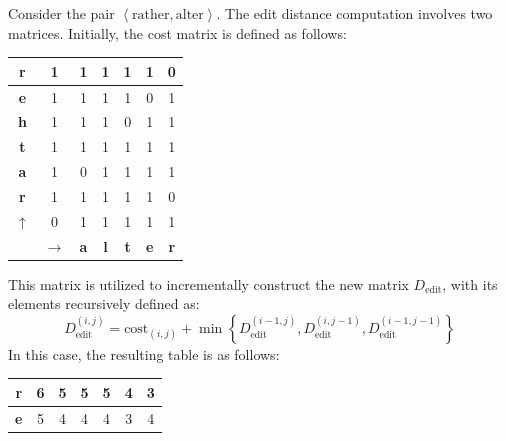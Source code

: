 \begin{example}
    Consider the pair $\left\langle \text{rather},\text{alter} \right\rangle$. 
    The edit distance computation involves two matrices. 
    Initially, the cost matrix is defined as follows:
    \begin{table}[H]
        \centering
        \begin{tabular}{c|c|c|c|c|c|c|}
        \hline
        \multicolumn{1}{|c|}{\textbf{r}} & 1         & 1          & 1          & 1          & 1          & 0          \\ \hline
        \multicolumn{1}{|c|}{\textbf{e}} & 1         & 1          & 1          & 1          & 0          & 1          \\ \hline
        \multicolumn{1}{|c|}{\textbf{h}} & 1         & 1          & 1          & 0          & 1          & 1          \\ \hline
        \multicolumn{1}{|c|}{\textbf{t}} & 1         & 1          & 1          & 1          & 1          & 1          \\ \hline
        \multicolumn{1}{|c|}{\textbf{a}} & 1         & 0          & 1          & 1          & 1          & 1          \\ \hline
        \multicolumn{1}{|c|}{\textbf{r}} & 1         & 1          & 1          & 1          & 1          & 0          \\ \hline
        \multicolumn{1}{|c|}{$\uparrow$}& 0         & 1          & 1          & 1          & 1          & 1          \\ \hline
                                         & $\rightarrow$ & \textbf{a} & \textbf{l} & \textbf{t} & \textbf{e} & \textbf{r} \\ \cline{2-7} 
        \end{tabular}
    \end{table}
    This matrix is utilized to incrementally construct the new matrix $D_{\text{edit}}$, with its elements recursively defined as:
    \[D_{\text{edit}}^{(i,j)}=\text{cost}_{(i,j)}+\min\left\{D_{\text{edit}}^{(i-1,j)},D_{\text{edit}}^{(i,j-1)},D_{\text{edit}}^{(i-1,j-1)}\right\}\]
    In this case, the resulting table is as follows:
    \begin{table}[H]
        \centering
        \begin{tabular}{c|c|c|c|c|c|c|}
        \hline
        \multicolumn{1}{|c|}{\textbf{r}}          & 6                      & 5          & 5          & 5          & 4          & 3          \\ \hline
        \multicolumn{1}{|c|}{\textbf{e}}          & 5                      & 4          & 4          & 4          & 3          & 4          \\ \hline

\end{tabular}
\end{table}
\end{example}
